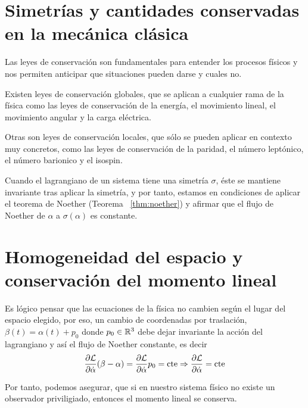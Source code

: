 \section{Simetrías y cantidades conservadas en la mecánica clásica}\label{sec:simetrias-y-cantidades-conservadas-en-la-mecanica-clasica}

Las leyes de conservación son fundamentales para entender los procesos físicos y nos permiten anticipar que situaciones pueden darse y cuales no.

Existen leyes de conservación globales, que se aplican a cualquier rama de la física como las leyes de conservación de la energía, el movimiento lineal, el movimiento angular y la carga eléctrica.

Otras son leyes de conservación locales, que sólo se pueden aplicar en contexto muy concretos, como las leyes de conservación de la paridad, el número leptónico, el número barionico y el isospin.

Cuando el lagrangiano de un sistema tiene una simetría $\sigma$, éste se mantiene invariante tras aplicar la simetría, y por tanto, estamos en condiciones de aplicar el teorema de Noether (Teorema ~\eqref{thm:noether}) y afirmar que el flujo de Noether de $\alpha$ a $\sigma(\alpha)$ es constante.

\section{Homogeneidad del espacio y conservación del momento lineal}\label{sec:homogeneidad-del-espacio-y-conservacion-del-momento-lineal}
Es lógico pensar que las ecuaciones de la física no cambien según el lugar del espacio elegido, por eso, un cambio de coordenadas por traslación, $\beta(t)=\alpha(t)+p_0$ donde $p_0\in\mathbb{R}^3$ debe dejar invariante la acción del lagrangiano y así el flujo de Noether constante, es decir
\begin{equation}
	\label{eq:conservacion_momento_lineal}
	\frac{\partial \mathcal{L}}{\partial\dot{\alpha}}(\beta-\alpha) = \frac{\partial \mathcal{L}}{\partial\dot{\alpha}}p_0=\text{cte}\Rightarrow\frac{\partial \mathcal{L}}{\partial\dot{\alpha}}=\text{cte}
\end{equation}

Por tanto, podemos asegurar, que si en nuestro sistema físico no existe un observador priviligiado, entonces el momento lineal se conserva.

